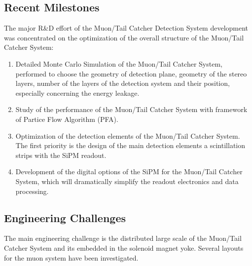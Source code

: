 \subsection{Recent Milestones}
The major R\&D effort of the Muon/Tail Catcher Detection System development was concentrated on the optimization of the overall structure of the Muon/Tail Catcher System:
\begin{enumerate}
\item Detailed Monte Carlo Simulation of the Muon/Tail Catcher System, performed to choose the geometry of detection plane, geometry of the stereo layers, number of the layers of the detection system and their position, especially concerning the energy leakage.
\item Study of the performance of the Muon/Tail Catcher System with framework of Partice Flow Algorithm (PFA).
\item Optimization of the detection elements of the Muon/Tail Catcher System. The first priority is the design of the main detection elements a scintillation strips with the SiPM readout.
\item Development of the digital options of the SiPM for the Muon/Tail Catcher System, which will dramatically simplify the readout electronics and data processing.
\end{enumerate}

\subsection{Engineering Challenges}
The main engineering challenge is the distributed large scale of the Muon/Tail Catcher System and its embedded in the solenoid magnet yoke.
Several layouts for the muon system have been investigated.

